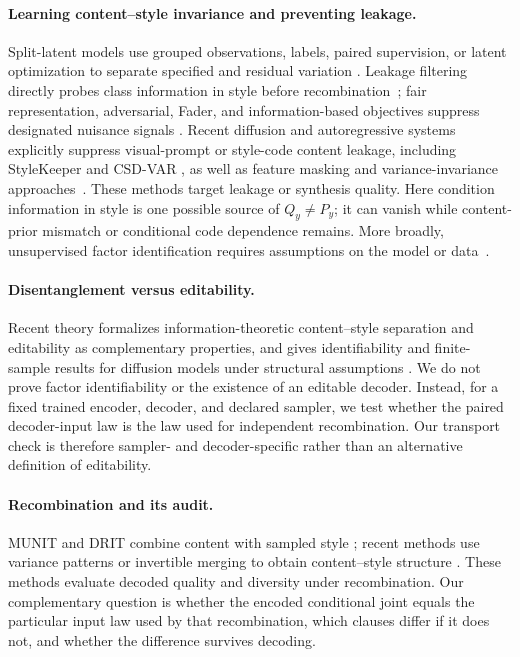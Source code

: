\documentclass{article}
\begin{document}
\paragraph{Learning content--style invariance and preventing leakage.}
Split-latent models use grouped observations, labels, paired supervision, or
latent optimization to separate specified and residual variation
\citep{mathieu2016disentangling,bouchacourt2018multilevel,jha2018cycle,ilse2020diva,gabbay2020lord}.
Leakage filtering directly probes class information in style before
recombination~\citep{ridgeway2018leakage}; fair representation, adversarial,
Fader, and information-based objectives suppress designated nuisance signals
\citep{louizos2015variational,ganin2015unsupervised,lample2017fader,moyer2018invariant}.
Recent diffusion and autoregressive systems explicitly suppress visual-prompt
or style-code content leakage, including StyleKeeper and CSD-VAR
\citep{jeong2025stylekeeper,nguyen2025csdvar}, as well as feature masking and
variance-invariance approaches~\citep{zhu2025less,wu2025variance}.  These
methods target leakage or synthesis quality.  Here condition information in
style is one possible source of $Q_y\ne P_y$; it can vanish while content-prior
mismatch or conditional code dependence remains.  More broadly, unsupervised
factor identification requires assumptions on the model or
data~\citep{locatello2019challenging}.

\paragraph{Disentanglement versus editability.}
Recent theory formalizes information-theoretic content--style separation and
editability as complementary properties, and gives identifiability and
finite-sample results for diffusion models under structural assumptions
\citep{wang2025candiffusion}.  We do not prove factor identifiability or the
existence of an editable decoder.  Instead, for a fixed trained encoder,
decoder, and declared sampler, we test whether the paired decoder-input law is
the law used for independent recombination.  Our transport check is therefore
sampler- and decoder-specific rather than an alternative definition of
editability.

\paragraph{Recombination and its audit.}
MUNIT and DRIT combine content with sampled style
\citep{huang2018munit,lee2018drit}; recent methods use variance patterns or
invertible merging to obtain content--style structure
\citep{wu2025variance,ma2025scflow}.  These methods evaluate decoded quality and
diversity under recombination.  Our complementary question is whether the
encoded conditional joint equals the particular input law used by that
recombination, which clauses differ if it does not, and whether the difference
survives decoding.
\end{document}
